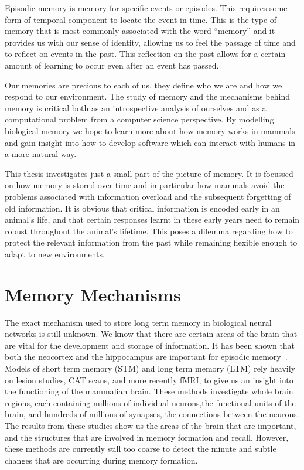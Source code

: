 Episodic memory is memory for specific events or episodes. This requires some form of temporal component to locate the event in time.  This is the type of memory that is most commonly associated with the word ``memory'' and it provides us with our sense of identity, allowing us to feel the passage of time and to reflect on events in the past.  This reflection on the past allows for a certain amount of learning to occur even after an event has passed.

Our memories are precious to each of us, they define who we are and how we respond to our environment. The study of memory and the mechanisms behind memory is critical both as an introspective analysis of ourselves and as a computational problem from a computer science perspective.  By modelling biological memory we hope to learn more about how memory works in mammals and gain insight into how to develop software which can interact with humans in a more natural way.

This thesis investigates just a small part of the picture of memory.  It is focussed on how memory is stored over time and in particular how mammals avoid the problems associated with information overload and the subsequent forgetting of old information.  It is obvious that critical information is encoded early in an animal's life, and that certain responses learnt in these early years need to remain robust throughout the animal's lifetime.  This poses a dilemma regarding how to protect the relevant information from the past while remaining flexible enough to adapt to new environments.

\section{Memory Mechanisms}

The exact mechanism used to store long term memory in biological neural networks is still unknown. We know that there are certain areas of the brain that are vital for the development and storage of information.  It has been shown that both the neocortex and the hippocampus are important for episodic memory~\citep{Atkinson1968,Meeter2003}.  Models of short term memory (STM) and long term memory (LTM) rely heavily on lesion studies, CAT scans, and more recently fMRI, to give us an insight into the functioning of the mammalian brain. These methods investigate whole brain regions, each containing millions of individual neurons,the functional units of the brain, and hundreds of millions of synapses, the connections between the neurons.  The results from these studies show us the areas of the brain that are important, and the structures that are involved in memory formation and recall.  However, these methods are currently still too coarse to detect the minute and subtle changes that are occurring during memory formation.

